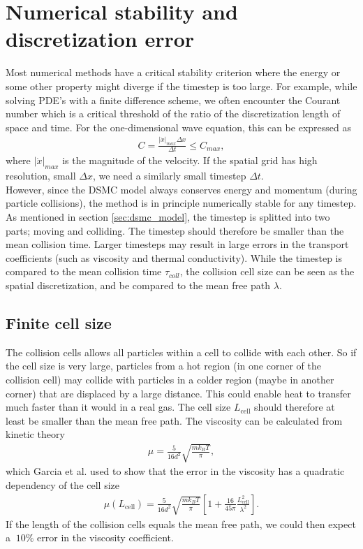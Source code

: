 \section{Numerical stability and discretization error}
\label{sec:dsmc_stability}
Most numerical methods have a critical stability criterion where the energy or some other property might diverge if the timestep is too large. For example, while solving PDE's with a finite difference scheme, we often encounter the Courant number which is a critical threshold of the ratio of the discretization length of space and time. For the one-dimensional wave equation, this can be expressed as
\begin{align}
	C = \frac{|\dot x|_{max} \Delta x}{\Delta t} \leq C_{max},
\end{align}
where $|\dot x|_{max}$ is the magnitude of the velocity. If the spatial grid has high resolution, small $\Delta x$, we need a similarly small timestep $\Delta t$.\\
However, since the DSMC model always conserves energy and momentum (during particle collisions), the method is in principle numerically stable for any timestep. As mentioned in section \ref{sec:dsmc_model}, the timestep is splitted into two parts; moving and colliding. The timestep should therefore be smaller than the mean collision time. Larger timesteps may result in large errors in the transport coefficients (such as viscosity and thermal conductivity)\cite{karniadakis2005microflows}. While the timestep is compared to the mean collision time $\tau_{coll}$, the collision cell size can be seen as the spatial discretization, and be compared to the mean free path $\lambda$. 
\subsection{Finite cell size}
The collision cells allows all particles within a cell to collide with each other. So if the cell size is very large, particles from a hot region (in one corner of the collision cell) may collide with particles in a colder region (maybe in another corner) that are displaced by a large distance. This could enable heat to transfer much faster than it would in a real gas. The cell size $L_\text{cell}$ should therefore at least be smaller than the mean free path\cite{karniadakis2005microflows}. The viscosity can be calculated from kinetic theory
\begin{align}
	\mu = \frac{5}{16d^2}\sqrt{\frac{mk_B T}{\pi}},
\end{align}
which Garcia et al. \cite{alexander1998cell} used to show that the error in the viscosity has a quadratic dependency of the cell size
\begin{align}
	\label{eq:viscosity_cell_size}
	\mu(L_\text{cell}) = \frac{5}{16d^2}\sqrt{\frac{mk_B T}{\pi}} \left [1 + \frac{16}{45\pi}\frac{L_\text{cell}^2}{\lambda^2}\right].
\end{align}
If the length of the collision cells equals the mean free path, we could then expect a $~10\%$ error in the viscosity coefficient.
